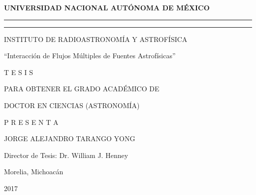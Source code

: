 \centering
\textbf{UNIVERSIDAD NACIONAL AUT\'ONOMA DE M\'EXICO}

\rule{\linewidth}{0.1pt}

\rule[3mm]{0.7\linewidth}{1pt}

INSTITUTO DE RADIOASTRONOM\'IA Y ASTROF\'ISICA

``Interacci\'on de Flujos M\'ultiples de Fuentes Astrof\'isicas''


T E S I S

PARA OBTENER EL GRADO ACAD\'EMICO DE

DOCTOR EN CIENCIAS (ASTRONOM\'IA)



P R E S E N T A

JORGE ALEJANDRO TARANGO YONG

Director de Tesis: Dr. William J. Henney


Morelia, Michoac\'an

2017
